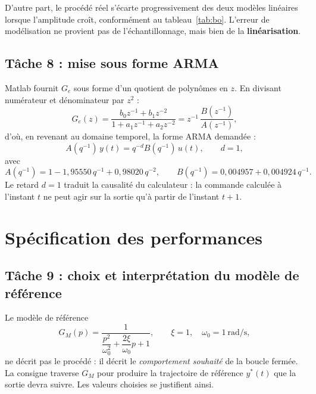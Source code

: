 \documentclass[11pt,a4paper]{report}
\begin{document}
D'autre part, le procédé réel s'écarte progressivement des deux modèles linéaires lorsque
l'amplitude croît, conformément au tableau~\ref{tab:bo}. L'erreur de modélisation ne provient
pas de l'échantillonnage, mais bien de la \textbf{linéarisation}.

\section{Tâche 8 : mise sous forme ARMA}

Matlab fournit $G_e$ sous forme d'un quotient de polynômes en $z$. En divisant numérateur et
dénominateur par $z^2$ :
\begin{equation}
  G_e(z) = \frac{b_0 z^{-1} + b_1 z^{-2}}{1 + a_1 z^{-1} + a_2 z^{-2}}
         = z^{-1}\,\frac{B(z^{-1})}{A(z^{-1})},
\end{equation}
d'où, en revenant au domaine temporel, la forme ARMA demandée :
\begin{equation}
  A(q^{-1})\,y(t) = q^{-d} B(q^{-1})\,u(t), \qquad d = 1,
  \label{eq:arma}
\end{equation}
avec
\begin{equation}
  A(q^{-1}) = 1 - 1{,}95550\,q^{-1} + 0{,}98020\,q^{-2},
  \qquad
  B(q^{-1}) = 0{,}004957 + 0{,}004924\,q^{-1}.
\end{equation}
Le retard $d = 1$ traduit la causalité du calculateur : la commande calculée à l'instant $t$ ne
peut agir sur la sortie qu'à partir de l'instant $t+1$.

\chapter{Spécification des performances}

\section{Tâche 9 : choix et interprétation du modèle de référence}

Le modèle de référence
\begin{equation}
  G_M(p) = \frac{1}{\dfrac{p^2}{\omega_0^2} + \dfrac{2\xi}{\omega_0}p + 1},
  \qquad \xi = 1,\quad \omega_0 = 1~\mathrm{rad/s},
\end{equation}
ne décrit pas le procédé : il décrit le \emph{comportement souhaité} de la boucle fermée. La
consigne traverse $G_M$ pour produire la trajectoire de référence $y^*(t)$ que la sortie devra
suivre. Les valeurs choisies se justifient ainsi.
\end{document}
